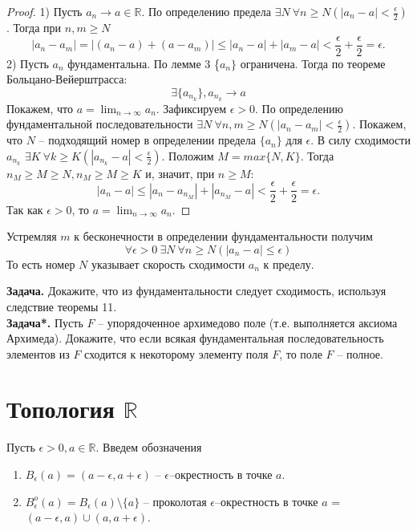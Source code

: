     \begin{proof}
        1) Пусть $a_{n} \rightarrow a \in \mathds{R}$. По определению предела $\exists N \  \forall n \geq N (|a_{n} - a| < \frac{\epsilon}{2})$. Тогда при $n, m \geq N$
        \[|a_{n} - a_{m}| = |(a_{n} - a) + (a - a_{m})| \leq |a_{n} - a| + |a_{m} - a| < \frac{\epsilon}{2} + \frac{\epsilon}{2} = \epsilon.\]
        2) Пусть $a_{n}$ фундаментальна. По лемме 3 \{$a_{n}\}$ ограничена. Тогда по теореме Больцано-Вейерштрасса:
        \[\exists \{a_{n_{k}}\}, a_{n_{k}} \rightarrow a\]
        Покажем, что $a = \lim_{n \to \infty} a_{n}$. Зафиксируем $\epsilon > 0$. По определению фундаментальной последовательности $\exists N \ \forall n,m \geq N (|a_{n} - a_{m}| < \frac{\epsilon}{2})$. Покажем, что $N$ -- подходящий номер в определении предела $\{a_{n}\}$ для $\epsilon$. В силу сходимости $a_{n_{k}}$ $\exists K \ \forall k \geq K (|a_{n_{k}} - a| < \frac{\epsilon}{2})$. Положим $M = max\{N, K\}$. Тогда $n_{M} \geq M \geq N, n_{M} \geq M \geq K$ и, значит, при $n \geq M$:
        \[|a_{n} - a| \leq |a_{n} - a_{n_{M}}| + |a_{n_{M}} - a| < \frac{\epsilon}{2} + \frac{\epsilon}{2} = \epsilon.\]
        Так как $\epsilon > 0$, то $a = \lim_{n \to \infty} a_{n}$.
    \end{proof}
    
    \begin{note}
        Устремляя $m$ к бесконечности в определении фундаментальности получим
        \[\forall \epsilon > 0 \ \exists N \ \forall n \geq N (|a_{n} - a| \leq \epsilon)\]
        То есть номер $N$ указывает скорость сходимости $a_{n}$ к пределу.
    \end{note}
    
    \textbf{Задача.} Докажите, что из фундаментальности следует сходимость, используя следствие теоремы 11.
    \\
    \textbf{Задача*.} Пусть $F$ -- упорядоченное архимедово поле (т.е. выполняется аксиома Архимеда). Докажите, что если всякая фундаментальная последовательность элементов из $F$ сходится к некоторому элементу поля $F$, то поле $F$ -- полное.
    
\section{Топология $\mathbb{R}$}

    \begin{definition}
        Пусть $\epsilon > 0, a \in \mathds{R}$. Введем обозначения
        \begin{enumerate}
            \item $B_{\epsilon}(a) = (a - \epsilon , a + \epsilon)$ -- $\epsilon$--окрестность в точке $a$.
            \item $B_{\epsilon}^{o}(a) = B_{\epsilon}(a) \setminus \{a\}$ -- проколотая $\epsilon$--окрестность в точке $a$ = $(a - \epsilon, a) \cup (a, a + \epsilon)$.
        \end{enumerate}
    \end{definition}
    
